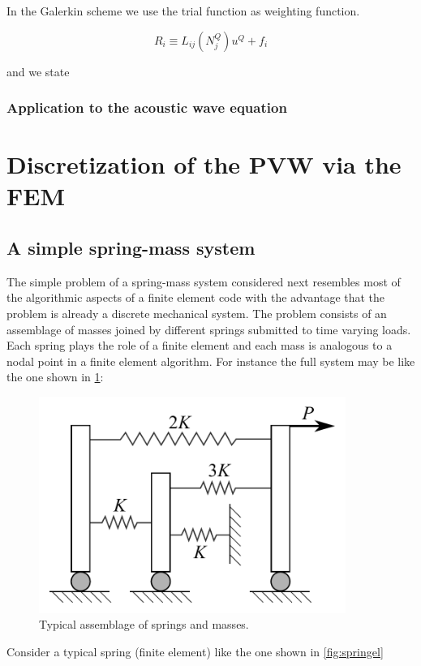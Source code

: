 In the Galerkin scheme we use the trial function as weighting function.

\[{R_i} \equiv {L_{ij}}(N_j^Q){u^Q} + {f_i}\]

and we state



\subsubsection*{Application to the acoustic wave equation}

\section[Discretization of the PVW using FEM]{Discretization of the PVW via the FEM}
\subsection*{A simple spring-mass system}
The simple problem of a spring-mass system considered next resembles most of the algorithmic aspects of a finite element code with the advantage that the problem is already a discrete mechanical system. The problem consists of an assemblage of masses joined by different springs submitted to time varying loads. Each spring plays the role of a finite element and each mass is analogous to a nodal point in a finite element algorithm. For instance the full system may be like the one shown in \cref{fig:bathe}:


\begin{figure}[H]
\centering
\includegraphics[width=10cm]{spring_system.pdf}
\caption{Typical assemblage of springs and masses.}
\label{fig:bathe}
\end{figure}


Consider a typical spring (finite element) like the one shown in \cref{fig:springel}

